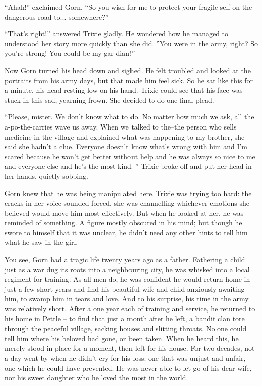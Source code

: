 ``Ahah!'' exclaimed Gorn. ``So you wish for me to protect your fragile self on
the dangerous road to... somewhere?''

``That's right!'' answered Trixie gladly. He wondered how he managed to
understood her story more quickly than she did. ''You were in the army, right?
So you're strong! You could be my gar-dian!''

Now Gorn turned his head down and sighed. He felt troubled and looked at the
portraits from his army days, but that made him feel sick. So he sat like this
for a minute, his head resting low on his hand. Trixie could see that his face
was stuck in this sad, yearning frown. She decided to do one final plead.

``Please, mister. We don't know what to do. No matter how much we ask, all the
a-po-the-carries wave us away. When we talked to the--the person who sells
medicine in the village and explained what was happening to my brother, she said
she hadn't a clue. Everyone doesn't know what's wrong with him and I'm scared
because he won't get better without help and he was always so nice to me and
everyone else and he's the most kind--'' Trixie broke off and put her head in
her hands, quietly sobbing.

Gorn knew that he was being manipulated here. Trixie was trying too hard: the
cracks in her voice sounded forced, she was channelling whichever emotions she
believed would move him most effectively. But when he looked at her, he was
reminded of something. A figure mostly obscured in his mind; but though he swore
to himself that it was unclear, he didn't need any other hints to tell him what
he saw in the girl.

You see, Gorn had a tragic life twenty years ago as a father. Fathering a child
just as a war dug its roots into a neighbouring city, he was whisked into a
local regiment for training. As all men do, he was confident he would return
home in just a few short years and find his beautiful wife and child anxiously
awaiting him, to swamp him in tears and love. And to his surprise, his time in
the army was relatively short. After a one year each of training and service, he
returned to his home in Pettle -- to find that just a month after he left, a
bandit clan tore through the peaceful village, sacking houses and slitting
throats. No one could tell him where his beloved had gone, or been taken. When
he heard this, he merely stood in place for a moment, then left for his house.
For two decades, not a day went by when he didn't cry for his loss: one that was
unjust and unfair, one which he could have prevented. He was never able to let
go of his dear wife, nor his sweet daughter who he loved the most in the world.


